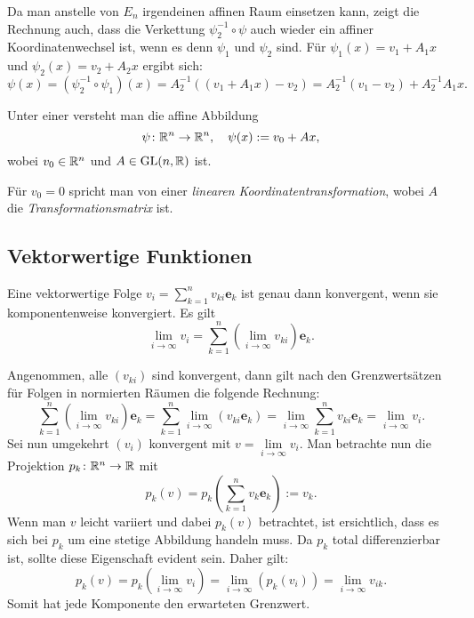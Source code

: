 Da man anstelle von $E_n$ irgendeinen affinen Raum einsetzen kann,
zeigt die Rechnung auch, dass die Verkettung $\psi_2^{-1}\circ\psi$
auch wieder ein affiner Koordinatenwechsel ist, wenn es denn $\psi_1$
und $\psi_2$ sind. Für $\psi_1(x)=v_1+A_1 x$ und
$\psi_2(x) = v_2+A_2 x$
ergibt sich:%
\begin{equation}
\psi(x) = (\psi_2^{-1}\circ\psi_1)(x)
= A_2^{-1}((v_1+A_1x)-v_2)
= A_2^{-1}(v_1-v_2) + A_2^{-1} A_1 x.
\end{equation}

\begin{definition}
Unter einer  versteht man
die affine Abbildung
\begin{equation}
\psi\colon\mathbb R^n\to\mathbb R^n,\quad \psi(x):=v_0+Ax,
\end{equation}
wobei $v_0\in\mathbb R^n$ und $A\in\operatorname{GL}(n,\mathbb R)$ ist.
\end{definition}
Für $v_0=0$ spricht man von einer \emph{linearen
Koordinatentransformation}, wobei $A$ die \emph{Transformationsmatrix}
ist.

\subsection{Vektorwertige Funktionen}
\begin{theorem}\label{lim-vektorwertige-Folge}
Eine vektorwertige Folge $v_i = \sum_{k=1}^n v_{ki}\mathbf e_k$
ist genau dann konvergent, wenn sie komponentenweise konvergiert.
Es gilt
\begin{equation}
\lim_{i\to\infty} v_i
= \sum_{k=1}^n (\lim_{i\to\infty} v_{ki})\mathbf e_k.
\end{equation}
\end{theorem}
 Angenommen, alle $(v_{ki})$ sind konvergent, dann gilt
nach den Grenzwertsätzen für Folgen in normierten Räumen die folgende
Rechnung:
\begin{equation}
\sum_{k=1}^n (\lim_{i\to\infty} v_{ki})\mathbf e_k
= \sum_{k=1}^n \lim_{i\to\infty} (v_{ki}\mathbf e_k)
= \lim_{i\to\infty}\sum_{k=1}^n v_{ki}\mathbf e_k = \lim_{i\to\infty} v_i.
\end{equation}
Sei nun umgekehrt $(v_i)$ konvergent mit $v = \lim\limits_{i\to\infty} v_i$.
Man betrachte nun die Projektion $p_k\colon\mathbb R^n\to\mathbb R$ mit
\begin{equation}
p_k(v) = p_k(\sum_{k=1}^n v_k\mathbf e_k) := v_k.
\end{equation}
Wenn man $v$ leicht variiert und dabei $p_k(v)$ betrachtet, ist
ersichtlich, dass es sich bei $p_k$ um eine stetige Abbildung handeln
muss. Da $p_k$ total differenzierbar ist, sollte diese Eigenschaft
evident sein. Daher gilt:
\begin{equation}
p_k(v) = p_k(\lim_{i\to\infty} v_i) = \lim_{i\to\infty}(p_k(v_i))
= \lim_{i\to\infty} v_{ik}.
\end{equation}
Somit hat jede Komponente den erwarteten Grenzwert.\;\qedsymbol

